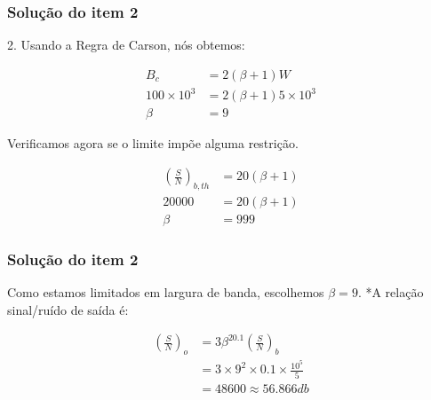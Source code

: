 \documentclass[aspectratio=169,dvipsnames]{beamer}
\begin{document}
\begin{frame}
  \frametitle{Solução do item 2}

  2. Usando a Regra de Carson, nós obtemos: 

\begin{align*}
B_c &= 2(\beta+1)W \\
100 \times 10^3 &= 2(\beta+1)5 \times 10^3 \\
\beta &= 9
\end{align*}

Verificamos agora se o limite impõe alguma restrição. 

\begin{align*}
\left(\frac{S}{N}\right)_{b,th} & = 20(\beta +1)\\
20000&= 20(\beta +1)\\
\beta &= 999
\end{align*} 

\end{frame}

\begin{frame}
  \frametitle{Solução do item 2}

  Como estamos limitados em largura de banda, escolhemos $\beta = 9$. *A relação sinal/ruído de saída é: 

\begin{align*}
\left(\frac{S}{N}\right)_{o} &= 3\beta^20.1\left(\frac{S}{N}\right)_{b}\\
&= 3 \times 9^2 \times0.1 \times \frac{10^5}{5}\\
&= 48600 \approx 56.866 db
\end{align*}

\end{frame}
\end{document}
